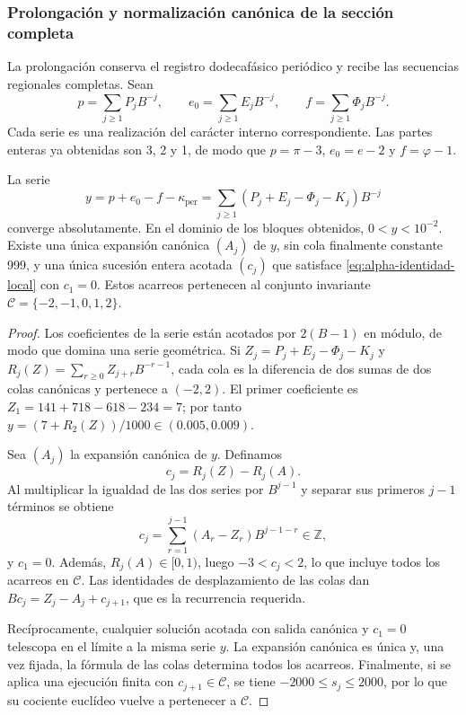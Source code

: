 \subsubsection{Prolongación y normalización canónica de la sección completa}
\label{subsec:alpha-completa}

La prolongación conserva el registro dodecafásico periódico y recibe las secuencias
regionales completas. Sean
\[
 p=\sum_{j\geq1}P_jB^{-j},\qquad
 e_0=\sum_{j\geq1}E_jB^{-j},\qquad
 f=\sum_{j\geq1}\Phi_jB^{-j}.
\]
Cada serie es una realización del carácter interno correspondiente.
Las partes enteras ya obtenidas son 3, 2 y 1, de modo que
\(p=\pi-3\), \(e_0=e-2\) y
\(f=\varphi-1\).

\begin{proposition}
\label{prop:alpha-normalizacion}
La serie
\begin{equation}
 y=p+e_0-f-\kappa_{\mathrm{per}}
   =\sum_{j\geq1}(P_j+E_j-\Phi_j-K_j)B^{-j}
 \label{eq:alpha-serie}
\end{equation}
converge absolutamente. En el dominio de los bloques obtenidos,
\(0<y<10^{-2}\). Existe una única expansión canónica \((A_j)\) de
\(y\), sin cola finalmente constante 999, y una única sucesión entera
acotada \((c_j)\) que satisface \eqref{eq:alpha-identidad-local} con
\(c_1=0\). Estos acarreos pertenecen al conjunto invariante
\(\mathcal C=\{-2,-1,0,1,2\}\).
\end{proposition}

\begin{proof}
Los coeficientes de la serie están acotados por \(2(B-1)\) en módulo,
de modo que domina una serie geométrica. Si
\(Z_j=P_j+E_j-\Phi_j-K_j\) y
\(R_j(Z)=\sum_{r\geq0}Z_{j+r}B^{-r-1}\), cada cola es la diferencia
de dos sumas de dos colas canónicas y pertenece a \((-2,2)\).
El primer coeficiente es
\(Z_1=141+718-618-234=7\); por tanto
\(y=(7+R_2(Z))/1000\in(0.005,0.009)\).

Sea \((A_j)\) la expansión canónica de \(y\). Definamos
\[
 c_j=R_j(Z)-R_j(A).
\]
Al multiplicar la igualdad de las dos series por \(B^{j-1}\) y separar
sus primeros \(j-1\) términos se obtiene
\[
 c_j=\sum_{r=1}^{j-1}(A_r-Z_r)B^{j-1-r}\in\mathbb Z,
\]
y \(c_1=0\). Además, \(R_j(A)\in[0,1)\), luego
\(-3<c_j<2\), lo que incluye todos los acarreos en \(\mathcal C\).
Las identidades de desplazamiento de las colas dan
\(Bc_j=Z_j-A_j+c_{j+1}\), que es la recurrencia requerida.

Recíprocamente, cualquier solución acotada con salida canónica y
\(c_1=0\) telescopa en el límite a la misma serie \(y\). La expansión
canónica es única y, una vez fijada, la fórmula de las colas determina
todos los acarreos. Finalmente, si se aplica una ejecución finita con
\(c_{j+1}\in\mathcal C\), se tiene \(-2000\leq s_j\leq2000\),
por lo que su cociente euclídeo vuelve a pertenecer a \(\mathcal C\).
\end{proof}

